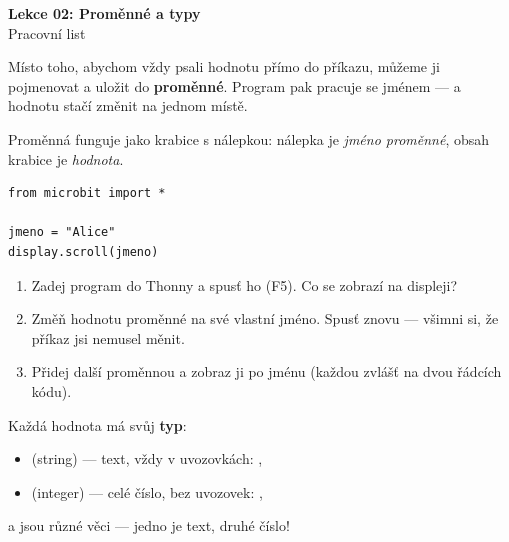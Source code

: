 \newcommand{\lekce}{Lekce 02 -- Pracovní list}




\begin{center}
  {\Large\bfseries\textcolor{microbit-blue}{Lekce 02: Proměnné a typy}}\\[4pt]
  {\large Pracovní list}
\end{center}

\medskip\noindent
Místo toho, abychom vždy psali hodnotu přímo do příkazu, můžeme ji pojmenovat
a uložit do \textbf{proměnné}. Program pak pracuje se jménem — a hodnotu
stačí změnit na jednom místě.

\begin{ukol}

Proměnná funguje jako krabice s nálepkou: nálepka je \emph{jméno proměnné},
obsah krabice je \emph{hodnota}.

\begin{lstlisting}
from microbit import *

jmeno = "Alice"
display.scroll(jmeno)
\end{lstlisting}

\begin{enumerate}
  \item Zadej program do Thonny a spusť ho (F5).
        Co se zobrazí na displeji?
  \item Změň hodnotu proměnné  na své vlastní jméno.
        Spusť znovu — všimni si, že příkaz  jsi nemusel měnit.
  \item Přidej další proměnnou  a zobraz ji po jménu
        (každou zvlášť na dvou řádcích kódu).
\end{enumerate}

\odpoved[2cm]

\begin{tcolorbox}[colback=code-bg, colframe=gray!40, fonttitle=\small\bfseries,
                  title=Typy hodnot]
  \small
  Každá hodnota má svůj \textbf{typ}:
  \begin{itemize}[leftmargin=*]
    \item {} (string) — text, vždy v uvozovkách: , 
    \item {} (integer) — celé číslo, bez uvozovek: , 
  \end{itemize}
   a  jsou různé věci — jedno je text, druhé číslo!
\end{tcolorbox}

\end{ukol}

